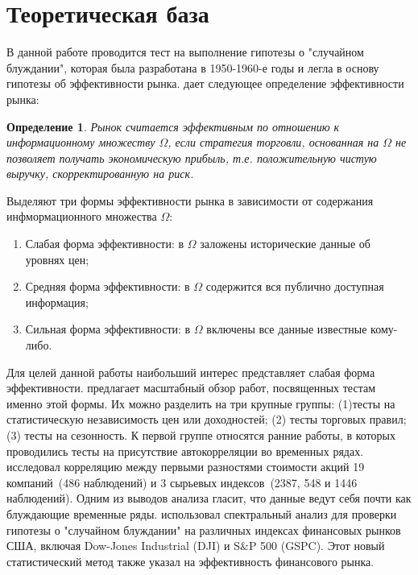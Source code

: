 ﻿\documentclass[a4paper,12pt]{article}
\newtheorem{definition}{Определение}
\begin{document}
\section{Теоретическая база}
В данной работе проводится тест на выполнение гипотезы о "случайном блуждании", которая была разработана в 1950-1960-е годы и легла в основу гипотезы об эффективности рынка. \cite{Jensen1978} дает следующее определение эффективности рынка:
\begin{definition}
  \label{EM}
  Рынок считается эффективным по отношению к информационному множеству $\Omega$, если стратегия торговли, основанная на $\Omega$ не позволяет получать экономическую прибыль, т.е. положительную чистую выручку, скорректированную на риск.
\end{definition}
Выделяют три формы эффективности рынка в зависимости от содержания инфмормационного множества $\Omega$:
\begin{enumerate}
  \item Слабая форма эффективности: в $\Omega$ заложены исторические данные об уровнях цен;
  \item Средняя форма эффективности: в $\Omega$ содержится вся публично доступная информация;
  \item Сильная форма эффективности: в $\Omega$ включены все данные известные кому-либо.
\end{enumerate}
Для целей данной работы наибольший интерес представляет слабая форма эффективности. \cite{Peon2019} предлагает масштабный обзор работ, посвященных тестам именно этой формы. Их можно разделить на три крупные группы: (1)тесты на статистическую независимость цен или доходностей; (2) тесты торговых правил; (3) тесты на сезонность. К первой группе относятся ранние работы, в которых проводились тесты на присутствие автокорреляции во временных рядах. \cite{Kendall1953} исследовал корреляцию между первыми разностями стоимости акций 19 компаний~(486 наблюдений) и 3 сырьевых индексов~(2387, 548 и 1446 наблюдений). Одним из выводов анализа гласит, что данные ведут себя почти как блуждающие временные ряды. \cite{Granger1963} использовал спектральный анализ для проверки гипотезы о "случайном блуждании" на различных индексах финансовых рынков США, включая Dow-Jones Industrial (DJI) и S$\&$P 500 (GSPC). Этот новый статистический метод также указал на эффективность финансового рынка.
\newpage


\end{document}
